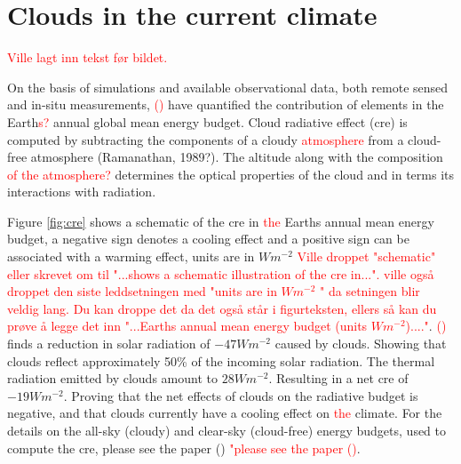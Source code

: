 \section{Clouds in the current climate} \label{sec:intro_cloud_current_climate}
\textcolor{red}{Ville lagt inn tekst før bildet. }

On the basis of simulations and available observational data, both remote sensed and in-situ measurements, \citeauthor{Wild2019TheModels}  \textcolor{red}{(\citeyear{Wild2019TheModels})} have quantified the contribution of elements in the Earth\textcolor{red}{s?} annual global mean energy budget. Cloud radiative effect (\acrshort{cre}) is computed by subtracting the components of a cloudy \textcolor{red}{atmosphere} from a cloud-free atmosphere (Ramanathan, 1989?). The altitude along with the composition \textcolor{red}{of the atmosphere?} determines the optical properties of the cloud and in terms its interactions with radiation.

Figure \ref{fig:cre} shows a schematic of the \acrshort{cre} in \textcolor{red}{the} Earths annual mean energy budget, a negative sign denotes a cooling effect and a positive sign can be associated with a warming effect, units are in $W m^{-2}$ \textcolor{red}{Ville droppet "schematic" eller skrevet om til "...shows a schematic illustration of the \acrshort{cre} in...". ville også droppet den siste leddsetningen med "units are in $W m^{-2}$
" da setningen blir veldig lang. Du kan droppe det da det også står i figurteksten, ellers så kan du prøve å legge det inn "...Earths annual mean energy budget (units $W m^{-2}$)...."}. \citeauthor{Wild2019TheModels} \textcolor{red}{(\citeyear{Wild2019TheModels})} finds a reduction in solar radiation of $-47Wm^{-2}$ caused by clouds. Showing that clouds reflect approximately 50\% of the incoming solar radiation. The thermal radiation emitted by clouds amount to $28Wm^{-2}$. Resulting in a net \acrshort{cre} of $-19Wm^{-2}$. Proving that the net effects of clouds on the radiative budget is negative, and that clouds currently have a cooling effect on \textcolor{red}{the} climate. For the details on the all-sky (cloudy) and clear-sky (cloud-free) energy budgets, used to compute the \acrshort{cre}, please see the paper (\cite{Wild2019TheModels}) \textcolor{red}{"please see the paper \citeauthor{Wild2019TheModels} (\citeyear{Wild2019TheModels})}. %

